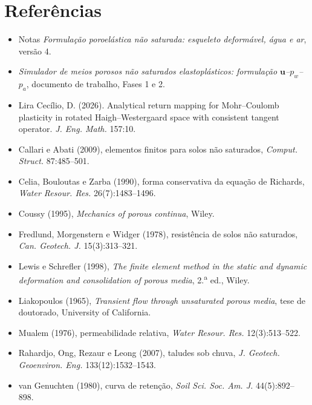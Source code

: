 \documentclass[11pt,a4paper]{article}
\newcommand{\vu}{\bm u}
\begin{document}
\section*{Referências}
{\footnotesize\raggedright
\begin{itemize}[leftmargin=2.6em,labelsep=0.5em,itemsep=0pt]
\item[{[N]}] Notas \emph{Formulação poroelástica não saturada: esqueleto deformável,
  água e ar}, versão 4.
\item[{[F]}] \emph{Simulador de meios porosos não saturados elastoplásticos:
  formulação $\vu$--$p_w$--$p_a$}, documento de trabalho, Fases 1 e 2.
\item[{[A]}] Lira Cecílio, D. (2026). Analytical return mapping for Mohr--Coulomb
  plasticity in rotated Haigh--Westergaard space with consistent tangent operator.
  \emph{J. Eng. Math.} 157:10.
\item[] Callari e Abati (2009), elementos finitos para solos não saturados,
  \emph{Comput. Struct.} 87:485--501.
\item[] Celia, Bouloutas e Zarba (1990), forma conservativa da equação de Richards,
  \emph{Water Resour. Res.} 26(7):1483--1496.
\item[] Coussy (1995), \emph{Mechanics of porous continua}, Wiley.
\item[] Fredlund, Morgenstern e Widger (1978), resistência de solos não saturados,
  \emph{Can. Geotech. J.} 15(3):313--321.
\item[] Lewis e Schrefler (1998), \emph{The finite element method in the static and dynamic
  deformation and consolidation of porous media}, 2.\textsuperscript{a} ed., Wiley.
\item[] Liakopoulos (1965), \emph{Transient flow through unsaturated porous media}, tese de
  doutorado, University of California.
\item[] Mualem (1976), permeabilidade relativa, \emph{Water Resour. Res.} 12(3):513--522.
\item[] Rahardjo, Ong, Rezaur e Leong (2007), taludes sob chuva,
  \emph{J. Geotech. Geoenviron. Eng.} 133(12):1532--1543.
\item[] van Genuchten (1980), curva de retenção, \emph{Soil Sci. Soc. Am. J.}
  44(5):892--898.
\end{itemize}
}
\end{document}
